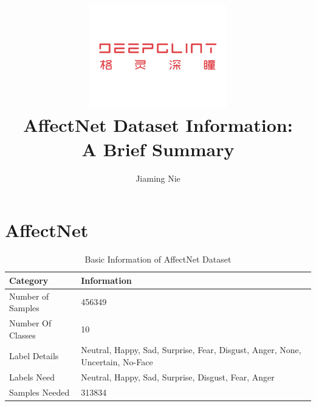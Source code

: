 \documentclass[11pt, a4paper]{article}
\title{\includegraphics[width=0.45\textwidth]{dg}
        \\ AffectNet Dataset Information: \\ A Brief Summary  
        }          %
\author{Jiaming Nie}                    %
\begin{document}
\begin{titlepage}
		
\maketitle
{} %





\thispagestyle{empty}  %

\end{titlepage}


\newpage

\section{AffectNet}

\begin{table}[htbp] 
	\begin{center}
		\caption{Basic Information of AffectNet Dataset}
		\begin{tabular}{l|l} \hline
		 Category    &    Information \\ \hline
		 Number of Samples &  456349       \\ 
		 Number Of Classes &     10     \\ 
		 Label Details    & Neutral, Happy, Sad, Surprise, Fear, Disgust, Anger, None, Uncertain, No-Face               \\
		 Labels Need & Neutral, Happy, Sad, Surprise, Disgust, Fear, Anger \\
		 Samples Needed &   313834     \\ \hline
		\end{tabular}
		
		\label{tab:affectNet}
	\end{center}
\end{table}






\newpage
  
 





\end{document}
